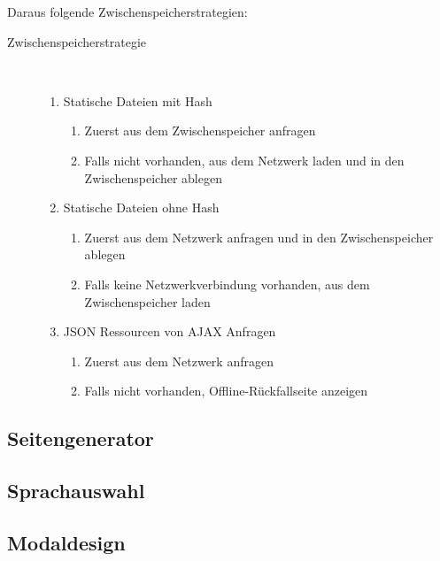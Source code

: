 Daraus folgende Zwischenspeicherstrategien:

\begin{description}
    \item[Zwischenspeicherstrategie]~\par
    \begin{enumerate}
       \item Statische Dateien mit Hash
       \begin{enumerate}
          \item Zuerst aus dem Zwischenspeicher anfragen
          \item Falls nicht vorhanden, aus dem Netzwerk laden und in den Zwischenspeicher ablegen
       \end{enumerate}
       \item Statische Dateien ohne Hash
       \begin{enumerate}
            \item Zuerst aus dem Netzwerk anfragen und in den Zwischenspeicher ablegen
            \item Falls keine Netzwerkverbindung vorhanden, aus dem Zwischenspeicher laden
        \end{enumerate}
        \item JSON Ressourcen von AJAX Anfragen
        \begin{enumerate}
             \item Zuerst aus dem Netzwerk anfragen
             \item Falls nicht vorhanden, Offline-Rückfallseite anzeigen 
         \end{enumerate}
    \end{enumerate}
 \end{description}


\subsection{Seitengenerator}

\subsection{Sprachauswahl}

\subsection{Modaldesign}


